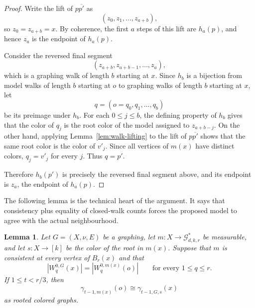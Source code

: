 \documentclass[11pt]{amsart}
\newcommand{\calG}{\mathcal G}
\newtheorem{lemma}[theorem]{Lemma}
\theoremstyle{remark}
\begin{document}
\begin{proof}
Write the lift of $p\overline{p'}$ as
\[
 (z_0,z_1,\ldots,z_{a+b}),
\]
so $z_0=z_{a+b}=x$.  By coherence, the first $a$ steps of this lift are $h_a(p)$, and hence $z_a$ is the endpoint of $h_a(p)$.

Consider the reversed final segment
\[
 (z_{a+b},z_{a+b-1},\ldots,z_a),
\]
which is a graphing walk of length $b$ starting at $x$.  Since $h_b$ is a bijection from model walks of length $b$ starting at $o$ to graphing walks of length $b$ starting at $x$, let
\[
 q=(o=q_0,q_1,\ldots,q_b)
\]
be its preimage under $h_b$.  For each $0\leq j\leq b$, the defining property of $h_b$ gives that the color of $q_j$ is the root color of the model assigned to $z_{a+b-j}$.  On the other hand, applying Lemma~\ref{lem:walk-lifting} to the lift of $p\overline{p'}$ shows that the same root color is the color of $v'_j$.  Since all vertices of $m(x)$ have distinct colors, $q_j=v'_j$ for every $j$.  Thus $q=p'$.

Therefore $h_b(p')$ is precisely the reversed final segment above, and its endpoint is $z_a$, the endpoint of $h_a(p)$.
\end{proof}

The following lemma is the technical heart of the argument.  It says that consistency plus equality of closed-walk counts forces the proposed model to agree with the actual neighbourhood.

\begin{lemma}\label{lem:isomorphism-from-closed-walks}
Let $G=(X,\nu,E)$ be a graphing, let $m\colon X\to\calG^*_{d,k,r}$ be measurable, and let $s\colon X\to[k]$ be the color of the root in $m(x)$.  Suppose that $m$ is consistent at every vertex of $B_r(x)$ and that
\[
 |W_{q}^{0,G}(x)|=|W_{q}^{0,m(x)}(o)|
 \qquad\text{for every }1\leq q\leq r.
\]
If $1\leq t<r/3$, then
\[
 \gamma_{t-1,m(x)}(o)\cong \gamma_{t-1,G,s}(x)
\]
as rooted colored graphs.
\end{lemma}
\end{document}
